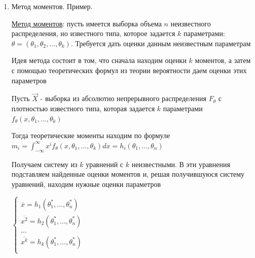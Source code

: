 \documentclass[12pt]{article}
\begin{document}
\begin{enumerate}
\begin{MyTheorem}
        2) $\overline{x} \overset{p}{\longrightarrow} a$ при $n \to \infty$
    \end{MyTheorem}
    
    \begin{MyTheorem}
        \Ths Выборочный $k$-ый момент является состоятельной несмещенной оценкой теоретического $k$-ого момента
    
        1) $E \overline{X^k} = E X^k$
    
        2) $\overline{X^k} \overset{p}{\longrightarrow} X^k$
    \end{MyTheorem}
    
    \begin{MyTheorem}
        \Ths Выборочной дисперсией $D^*$ и $S^2$ являются состоятельными оценками теоретической дисперсией, при этом $D^*$ - смещенная оценка, а $S^2$ - несмещенная оценка
    \end{MyTheorem}

    \item Метод моментов. Пример.

    \hyperlink{method_of_moments}{Метод моментов}: пусть имеется выборка объема $n$ неизвестного распределения, но известного типа,
    которое задается $k$ параметрами: $\theta = (\theta_1, \theta_2, \dots, \theta_k)$. Требуется дать оценки данным
    неизвестным параметрам

    Идея метода состоит в том, что сначала находим оценки $k$ моментов, а затем с помощью теоретических формул
    из теории вероятности даем оценки этих параметров

    Пусть $\vec{X}$ - выборка из абсолютно непрерывного распределения $F_\theta$ с плотностью известного типа, 
    которая задается $k$ параметрами $f_\theta (x, \theta_1, \dots, \theta_k)$

    Тогда теоретические моменты находим по формуле $m_i = \int_{-\infty}^{\infty} x^i f_\theta (x, \theta_1, \dots, \theta_k) dx = h_i(\theta_1, \dots, \theta_n)$

    Получаем систему из $k$ уравнений с $k$ неизвестными. В эти уравнения подставляем найденные оценки
    моментов и, решая получившуюся систему уравнений, находим нужные оценки параметров

    $\begin{cases}
    \overline{x} = h_1(\theta_1^*, \dots, \theta_n^*) \\ 
    \overline{x^2} = h_2(\theta_1^*, \dots, \theta_n^*) \\ 
    \dots \\
    \overline{x^k} = h_k(\theta_1^*, \dots, \theta_n^*) \\ 
    \end{cases}$


\end{enumerate}
\end{document}
